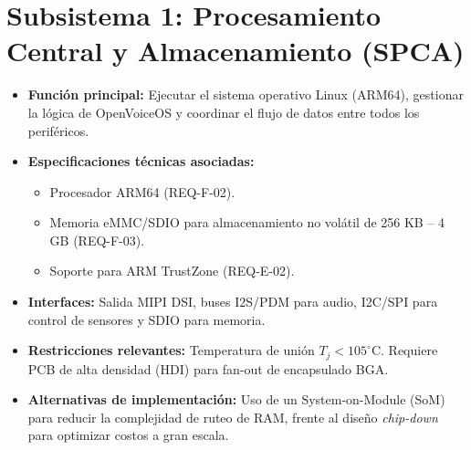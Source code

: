 \documentclass[%
	paper=a4,
	twoside=false,
	parskip=half,
	chapterprefix=false,
	10pt,
	headings=normal,
	bibliography=totoc,
	listof=totoc,
	titlepage=on,
	captions=tableabove,
	draft=false, 
]{scrbook}%
\begin{document}
\section{Subsistema 1: Procesamiento Central y Almacenamiento (SPCA)}
\begin{itemize}
    \item \textbf{Función principal:} Ejecutar el sistema operativo Linux (ARM64), gestionar la lógica de OpenVoiceOS y coordinar el flujo de datos entre todos los periféricos.
    \item \textbf{Especificaciones técnicas asociadas:}
        \begin{itemize}
            \item Procesador ARM64 (REQ-F-02).
            \item Memoria eMMC/SDIO para almacenamiento no volátil de 256 KB – 4 GB (REQ-F-03).
            \item Soporte para ARM TrustZone (REQ-E-02).
        \end{itemize}
    \item \textbf{Interfaces:} Salida MIPI DSI, buses I2S/PDM para audio, I2C/SPI para control de sensores y SDIO para memoria.
    \item \textbf{Restricciones relevantes:} Temperatura de unión $T_j < 105^\circ$C. Requiere PCB de alta densidad (HDI) para fan-out de encapsulado BGA.
    \item \textbf{Alternativas de implementación:} Uso de un System-on-Module (SoM) para reducir la complejidad de ruteo de RAM, frente al diseño \textit{chip-down} para optimizar costos a gran escala.
\end{itemize}
\end{document}

